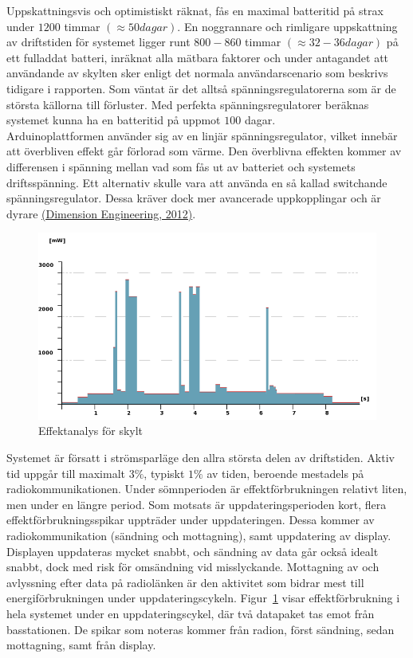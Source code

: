 \documentclass[a4paper,11pt]{article}
\begin{document}
Uppskattningsvis och optimistiskt räknat, fås en maximal batteritid på strax under $1200$ timmar $(\approx 50 dagar)$. En noggrannare och rimligare uppskattning av driftstiden för systemet ligger runt $800-860$ timmar $(\approx 32-36 dagar)$ på ett fulladdat batteri, inräknat alla mätbara faktorer och under antagandet att användande av skylten sker enligt det normala användarscenario som beskrivs tidigare i rapporten. Som väntat är det alltså spänningsregulatorerna som är de största källorna till förluster. Med perfekta spänningsregulatorer beräknas systemet kunna ha en batteritid på uppmot $100$ dagar. \\

Arduinoplattformen använder sig av en linjär spänningsregulator, vilket innebär att överbliven effekt går förlorad som värme. Den överblivna effekten kommer av differensen i spänning mellan vad som fås ut av batteriet och systemets driftsspänning. Ett alternativ skulle vara att använda en så kallad switchande spänningsregulator. Dessa kräver dock mer avancerade uppkopplingar och är dyrare \hyperref[dimension]{(Dimension Engineering, 2012)}. \\

\begin{figure}[H]
\begin{center}
\includegraphics[scale=0.70, angle=0]{effekt.png}
\end{center}
\caption{Effektanalys för skylt}
\label{fig:effectgraph}
\end{figure}

Systemet är försatt i strömsparläge den allra största delen av driftstiden. Aktiv tid uppgår till maximalt $3\%$, typiskt $1\%$ av tiden, beroende mestadels på radiokommunikationen. Under sömnperioden är effektförbrukningen relativt liten, men under en längre period. Som motsats är uppdateringsperioden kort, flera effektförbrukningsspikar uppträder under uppdateringen. Dessa kommer av radiokommunikation (sändning och mottagning), samt uppdatering av display. Displayen uppdateras mycket snabbt, och sändning av data går också idealt snabbt, dock med risk för omsändning vid misslyckande. Mottagning av och avlyssning efter data på radiolänken är den aktivitet som bidrar mest till energiförbrukningen under uppdateringscykeln. Figur~\ref{fig:effectgraph} visar effektförbrukning i hela systemet under en uppdateringscykel, där två datapaket tas emot från basstationen. De spikar som noteras kommer från radion, först sändning, sedan mottagning, samt från display.
\end{document}
